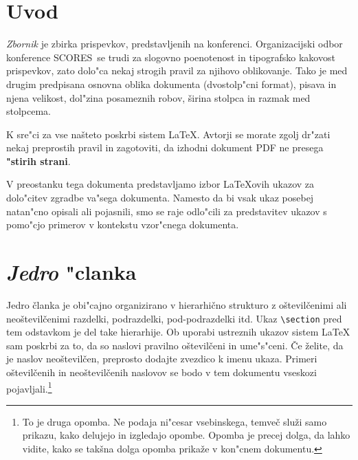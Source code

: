 \documentclass[sigconf]{acmart}
\newcommand{\scores}{\textsc{SCORES}}
\begin{document}

\maketitle

\section{Uvod}

\emph{Zbornik} je zbirka prispevkov, predstavljenih na konferenci.
Organizacijski odbor konference \scores\ se trudi za slogovno poenotenost in
tipografsko kakovost prispevkov, zato dolo"ca nekaj strogih pravil za njihovo
oblikovanje.  Tako je med drugim predpisana osnovna oblika dokumenta
(dvostolp"cni format), pisava in njena velikost, dol"zina posameznih robov,
širina stolpca in razmak med stolpcema.

K sre"ci za vse našteto poskrbi sistem \LaTeX.  Avtorji se morate zgolj
dr"zati nekaj preprostih pravil in zagotoviti, da izhodni dokument PDF ne
presega \textbf{"stirih strani}.

V preostanku tega dokumenta predstavljamo izbor \LaTeX{}ovih ukazov za
dolo"citev zgradbe va"sega dokumenta.  Namesto da bi vsak ukaz posebej
natan"cno opisali ali pojasnili, smo se raje odlo"cili za predstavitev ukazov
s pomo"cjo primerov v kontekstu vzor"cnega dokumenta.

\section{\emph{Jedro} "clanka}

Jedro članka je obi"cajno organizirano v hierarhično strukturo z oštevilčenimi
ali neoštevilčenimi razdelki, podrazdelki, pod-podrazdelki itd.  Ukaz
\texttt{\textbackslash{}section} pred tem odstavkom je del take hierarhije.
Ob uporabi ustreznih ukazov sistem \LaTeX{} sam poskrbi za to, da so naslovi
pravilno oštevilčeni in ume"s"ceni.  Če želite, da je naslov neoštevilčen,
preprosto dodajte zvezdico k imenu ukaza.  Primeri oštevilčenih in
neoštevilčenih naslovov se bodo v tem dokumentu vseskozi
pojavljali.\footnote{To je druga opomba. Ne podaja ni"cesar vsebinskega,
temveč služi samo prikazu, kako delujejo in izgledajo opombe.  Opomba je
precej dolga, da lahko vidite, kako se takšna dolga opomba prikaže v kon"cnem
dokumentu.}
\end{document}

